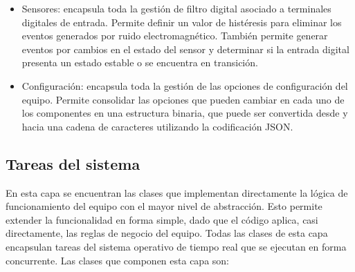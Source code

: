 \begin{itemize}
	\item Sensores: encapsula toda la gestión de filtro digital asociado a terminales digitales de entrada. Permite definir un valor de histéresis para eliminar los eventos generados por ruido electromagnético. También permite generar eventos por cambios en el estado del sensor y determinar si la entrada digital presenta un estado estable o se encuentra en transición.

	\item Configuración: encapsula toda la gestión de las opciones de configuración del equipo. Permite consolidar las opciones que pueden cambiar en cada uno de los componentes en una estructura binaria, que puede ser convertida desde y hacia una cadena de caracteres utilizando la codificación JSON.
\end{itemize}


\subsection{Tareas del sistema}

En esta capa se encuentran las clases que implementan directamente la lógica de funcionamiento del equipo con el  mayor nivel de abstracción. Esto permite extender la funcionalidad en forma simple, dado que el código aplica, casi directamente, las reglas de negocio del equipo. Todas las clases de esta capa encapsulan tareas del sistema operativo de tiempo real que se ejecutan en forma concurrente. Las clases que componen esta capa son:

